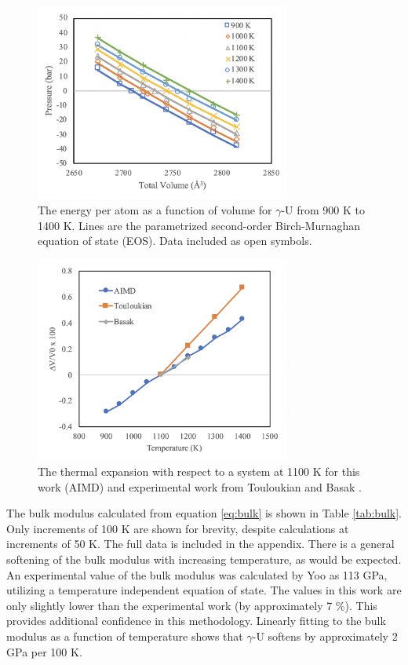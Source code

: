 \documentclass[review]{elsarticle}
\begin{document}
\begin{figure}[h]
 \centering
 \includegraphics[width=0.75\textwidth]{2_p_vs_v.png} 
 \caption{The energy per atom as a function of volume for $\gamma$-U from 900 K to 1400 K. Lines are the parametrized second-order Birch-Murnaghan equation of state (EOS). Data included as open symbols. }
 \label{fig:pvsv}
\end{figure}

\begin{figure}[h]
 \centering
 \includegraphics[width=0.75\textwidth]{3_thermal_exp.png} 
 \caption{The thermal expansion with respect to a system at 1100 K for this work (AIMD) and experimental work from Touloukian \cite{touloukian} and Basak \cite{basak} .   }
 \label{fig:exp}
\end{figure}

\FloatBarrier

The bulk modulus calculated from equation \ref{eq:bulk} is shown in Table \ref{tab:bulk}. Only increments of 100 K are shown for brevity, despite calculations at increments of 50 K. The full data is included in the appendix. There is a general softening of the bulk modulus with increasing temperature, as would be expected. An experimental value of the bulk modulus was calculated by Yoo \cite{yoo1998} as 113 GPa, utilizing a temperature independent equation of state. The values in this work are only slightly lower than the experimental work (by approximately 7 {\%}). This provides additional confidence in this methodology. Linearly fitting to the bulk modulus as a function of temperature shows that $\gamma$-U softens by approximately 2 GPa per 100 K. 
\end{document}
